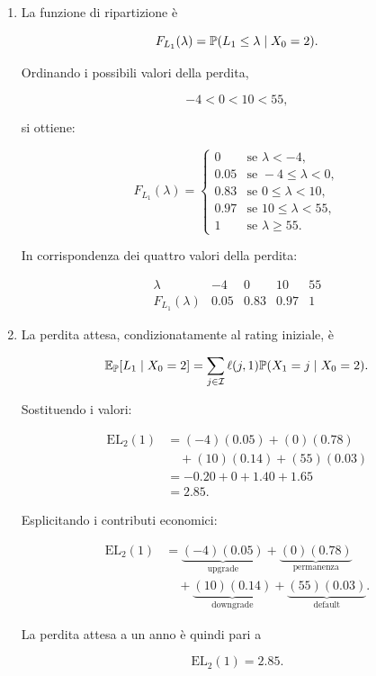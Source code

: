 \begin{enumerate}
\item La funzione di ripartizione \`{e}

\[
F_{L_1}(\lambda)
=
\mathbb{P}(L_1\leq\lambda\mid X_0=2).
\]

Ordinando i possibili valori della perdita,

\[
-4<0<10<55,
\]

si ottiene:

\[
F_{L_1}(\lambda)
=
\begin{cases}
0
&
\text{se }\lambda<-4,
\\
0.05
&
\text{se }-4\leq\lambda<0,
\\
0.83
&
\text{se }0\leq\lambda<10,
\\
0.97
&
\text{se }10\leq\lambda<55,
\\
1
&
\text{se }\lambda\geq55.
\end{cases}
\]

In corrispondenza dei quattro valori della perdita:

\[
\begin{array}{c|cccc}
\lambda
&
-4
&
0
&
10
&
55
\\
\hline
F_{L_1}(\lambda)
&
0.05
&
0.83
&
0.97
&
1
\end{array}
\]

\item La perdita attesa, condizionatamente al rating iniziale, \`{e}

\[
\mathbb{E}_{\mathbb{P}}[L_1\mid X_0=2]
=
\sum_{j\in\mathcal{I}}
\ell(j,1)
\mathbb{P}(X_1=j\mid X_0=2).
\]

Sostituendo i valori:

\[
\begin{split}
\mathrm{EL}_2(1)
&=
(-4)(0.05)
+
(0)(0.78)
\\
&\quad
+
(10)(0.14)
+
(55)(0.03)
\\
&=
-0.20+0+1.40+1.65
\\
&=
2.85.
\end{split}
\]

Esplicitando i contributi economici:

\[
\begin{split}
\mathrm{EL}_2(1)
&=
\underbrace{(-4)(0.05)}_{\text{upgrade}}
+
\underbrace{(0)(0.78)}_{\text{permanenza}}
\\
&\quad
+
\underbrace{(10)(0.14)}_{\text{downgrade}}
+
\underbrace{(55)(0.03)}_{\text{default}}.
\end{split}
\]

La perdita attesa a un anno \`{e} quindi pari a

\[
\boxed{\mathrm{EL}_2(1)=2.85}.
\]


\end{enumerate}
